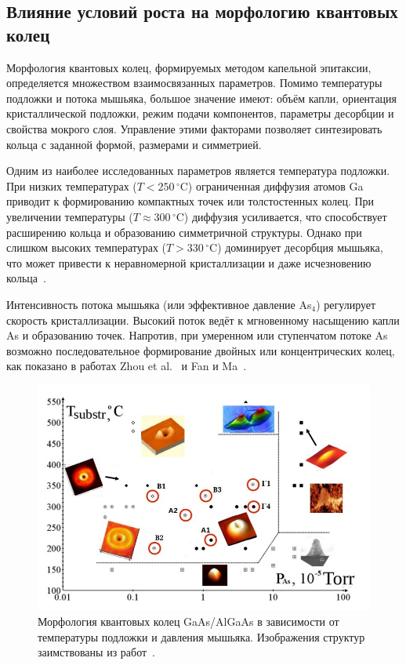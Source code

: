 \documentclass[14pt,oneside]{extarticle}
\begin{document}
\subsection{Влияние условий роста на морфологию квантовых колец}

Морфология квантовых колец, формируемых методом капельной эпитаксии, определяется множеством взаимосвязанных параметров. Помимо температуры подложки и потока мышьяка, большое значение имеют: объём капли, ориентация кристаллической подложки, режим подачи компонентов, параметры десорбции и свойства мокрого слоя. Управление этими факторами позволяет синтезировать кольца с заданной формой, размерами и симметрией.

Одним из наиболее исследованных параметров является температура подложки. При низких температурах ($T < 250\,^{\circ}\mathrm{C}$) ограниченная диффузия атомов Ga приводит к формированию компактных точек или толстостенных колец. При увеличении температуры ($T \approx 300\,^{\circ}\mathrm{C}$) диффузия усиливается, что способствует расширению кольца и образованию симметричной структуры. Однако при слишком высоких температурах ($T > 330\,^{\circ}\mathrm{C}$) доминирует десорбция мышьяка, что может привести к неравномерной кристаллизации и даже исчезновению кольца~\cite{sibirmovskiy2014,vasilevskiy2013}.

Интенсивность потока мышьяка (или эффективное давление As$_4$) регулирует скорость кристаллизации. Высокий поток ведёт к мгновенному насыщению капли As и образованию точек. Напротив, при умеренном или ступенчатом потоке As возможно последовательное формирование двойных или концентрических колец, как показано в работах Zhou et al.~\cite{zhou2013} и Fan и Ma~\cite{fan2023}.

\begin{figure}
    \begin{center}
        \includegraphics[width=14cm]{images/morphology_map.jpg}
        \caption{\label{fig:morph_map}
            Морфология квантовых колец GaAs/AlGaAs в зависимости от температуры подложки и давления мышьяка. Изображения структур заимствованы из работ~\cite{mano2005nano, koguchi2005growth, vasilevskiy2013}.}
    \end{center}
\end{figure}
\end{document}
